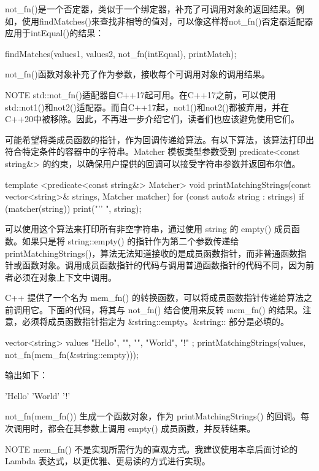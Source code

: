 not\_fn()是一个否定器，类似于一个绑定器，补充了可调用对象的返回结果。例如，使用findMatches()来查找非相等的值对，可以像这样将not\_fn()否定器适配器应用于intEqual()的结果：

\begin{cpp}
findMatches(values1, values2, not_fn(intEqual), printMatch);
\end{cpp}

not\_fn()函数对象补充了作为参数，接收每个可调用对象的调用结果。

\begin{myNotic}{NOTE}
std::not\_fn()适配器自C++17起可用。在C++17之前，可以使用std::not1()和not2()适配器。而自C++17起，not1()和not2()都被弃用，并在C++20中被移除。因此，不再进一步介绍它们，读者们也应该避免使用它们。
\end{myNotic}


可能希望将类成员函数的指针，作为回调传递给算法。有以下算法，该算法打印出符合特定条件的容器中的字符串。Matcher 模板类型参数受到 predicate<const string\&> 的约束，以确保用户提供的回调可以接受字符串参数并返回布尔值。

\begin{cpp}
template <predicate<const string&> Matcher>
void printMatchingStrings(const vector<string>& strings, Matcher matcher)
{
    for (const auto& string : strings) {
        if (matcher(string)) { print("'{}' ", string); }
    }
}
\end{cpp}

可以使用这个算法来打印所有非空字符串，通过使用 string 的 empty() 成员函数。如果只是将 string::empty() 的指针作为第二个参数传递给 printMatchingStrings()，算法无法知道接收的是成员函数指针，而非普通函数指针或函数对象。调用成员函数指针的代码与调用普通函数指针的代码不同，因为前者必须在对象上下文中调用。

C++ 提供了一个名为 mem\_fn() 的转换函数，可以将成员函数指针传递给算法之前调用它。下面的代码，将其与 not\_fn() 结合使用来反转 mem\_fn() 的结果。注意，必须将成员函数指针指定为 \&string::empty。\&string:: 部分是必填的。

\begin{cpp}
vector<string> values { "Hello", "", "", "World", "!" };
printMatchingStrings(values, not_fn(mem_fn(&string::empty)));
\end{cpp}

输出如下：

\begin{shell}
'Hello' 'World' '!'
\end{shell}

not\_fn(mem\_fn()) 生成一个函数对象，作为 printMatchingStrings() 的回调。每次调用时，都会在其参数上调用 empty() 成员函数，并反转结果。

\begin{myNotic}{NOTE}
mem\_fn() 不是实现所需行为的直观方式。我建议使用本章后面讨论的 Lambda 表达式，以更优雅、更易读的方式进行实现。
\end{myNotic}






